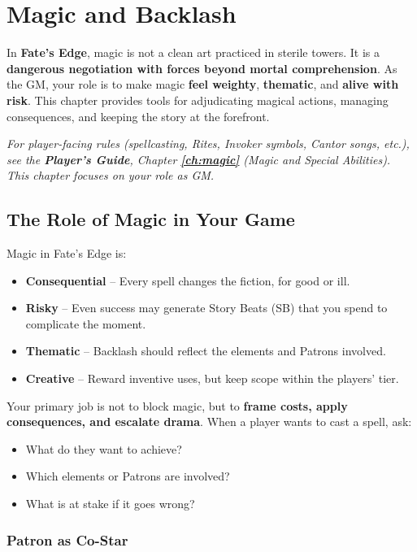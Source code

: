 \chapter{Magic and Backlash}
\label{ch:gm-magic}

In \textbf{Fate's Edge}, magic is not a clean art practiced in sterile towers. It is a \textbf{dangerous negotiation with forces beyond mortal comprehension}. As the GM, your role is to make magic \textbf{feel weighty}, \textbf{thematic}, and \textbf{alive with risk}. This chapter provides tools for adjudicating magical actions, managing consequences, and keeping the story at the forefront.

\emph{For player-facing rules (spellcasting, Rites, Invoker symbols, Cantor songs, etc.), see the \textbf{Player's Guide}, Chapter \textbf{\ref{ch:magic}} (Magic and Special Abilities). This chapter focuses on your role as GM.}

\section{The Role of Magic in Your Game}
\label{sec:gm-magic-philosophy}

Magic in Fate's Edge is:
\begin{itemize}
  \item \textbf{Consequential} -- Every spell changes the fiction, for good or ill.
  \item \textbf{Risky} -- Even success may generate Story Beats (SB) that you spend to complicate the moment.
  \item \textbf{Thematic} -- Backlash should reflect the elements and Patrons involved.
  \item \textbf{Creative} -- Reward inventive uses, but keep scope within the players' tier.
\end{itemize}

Your primary job is not to block magic, but to \textbf{frame costs, apply consequences, and escalate drama}. When a player wants to cast a spell, ask:
\begin{itemize}
  \item What do they want to achieve?
  \item Which elements or Patrons are involved?
  \item What is at stake if it goes wrong?
\end{itemize}

\subsection{Patron as Co-Star}
\label{subsec:patron-costar}

